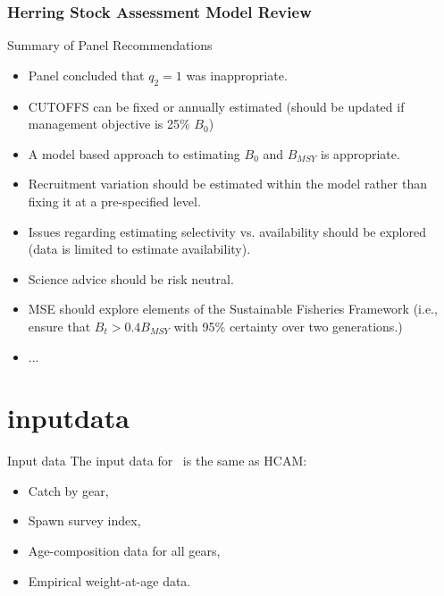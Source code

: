 %
\begin{frame}[allowframebreaks]
	\frametitle{Herring Stock Assessment Model Review} 
	\begin{block}
		{Summary of Panel Recommendations} 
		\begin{itemize}
			\item Panel concluded that $q_2=1$ was inappropriate. 
			\item CUTOFFS can be fixed or annually estimated (should be updated if management objective is 25\% $B_0$) 
			\item A model based approach to estimating $B_0$ and $B_{MSY}$ is appropriate. 
			\item Recruitment variation should be estimated within the model rather than fixing it at a pre-specified level. 
			\item Issues regarding estimating selectivity vs. availability should be explored (data is limited to estimate availability). 
			\item Science advice should be risk neutral. 
			\item MSE should explore elements of the Sustainable Fisheries Framework (i.e., ensure that $B_t>0.4B_{MSY}$ with 95\% certainty over two generations.) 
			\item ... 
		\end{itemize}
	\end{block}
\end{frame}




\section{inputdata} %
\label{sec:inputdata}

%
\begin{frame}
	{Input data} The input data for \iscam\ is the same as HCAM: 
	\begin{itemize}
		\item Catch by gear, 
		\item Spawn survey index, 
		\item Age-composition data for all gears, 
		\item Empirical weight-at-age data. 
	\end{itemize}
\end{frame}





